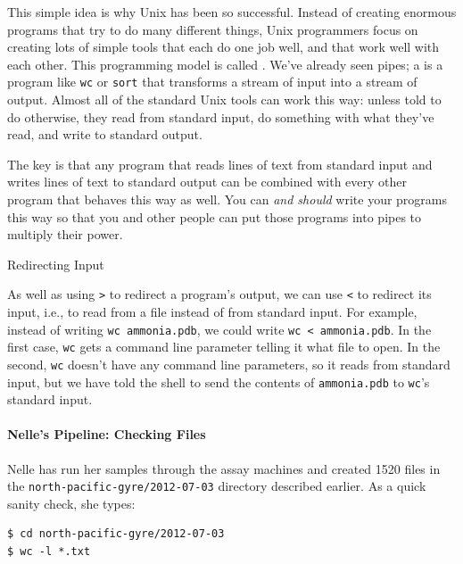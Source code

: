 \documentclass{book}
\begin{document}
This simple idea is why Unix has been so successful. Instead of creating
enormous programs that try to do many different things, Unix programmers
focus on creating lots of simple tools that each do one job well, and
that work well with each other. This programming model is called
. We've already seen
pipes; a  is a program like \texttt{wc} or
\texttt{sort} that transforms a stream of input into a stream of output.
Almost all of the standard Unix tools can work this way: unless told to
do otherwise, they read from standard input, do something with what
they've read, and write to standard output.

The key is that any program that reads lines of text from standard input
and writes lines of text to standard output can be combined with every
other program that behaves this way as well. You can \emph{and should}
write your programs this way so that you and other people can put those
programs into pipes to multiply their power.

\begin{swcbox}{Redirecting Input}

As well as using \texttt{\textgreater{}} to redirect a program's output,
we can use \texttt{\textless{}} to redirect its input, i.e., to read
from a file instead of from standard input. For example, instead of
writing \texttt{wc ammonia.pdb}, we could write
\texttt{wc \textless{} ammonia.pdb}. In the first case, \texttt{wc} gets
a command line parameter telling it what file to open. In the second,
\texttt{wc} doesn't have any command line parameters, so it reads from
standard input, but we have told the shell to send the contents of
\texttt{ammonia.pdb} to \texttt{wc}'s standard input.

\end{swcbox}

\mbox{}\paragraph{Nelle's Pipeline: Checking Files}

Nelle has run her samples through the assay machines and created 1520
files in the \texttt{north-pacific-gyre/2012-07-03} directory described
earlier. As a quick sanity check, she types:

\begin{verbatim}
$ cd north-pacific-gyre/2012-07-03
$ wc -l *.txt
\end{verbatim}
\end{document}
